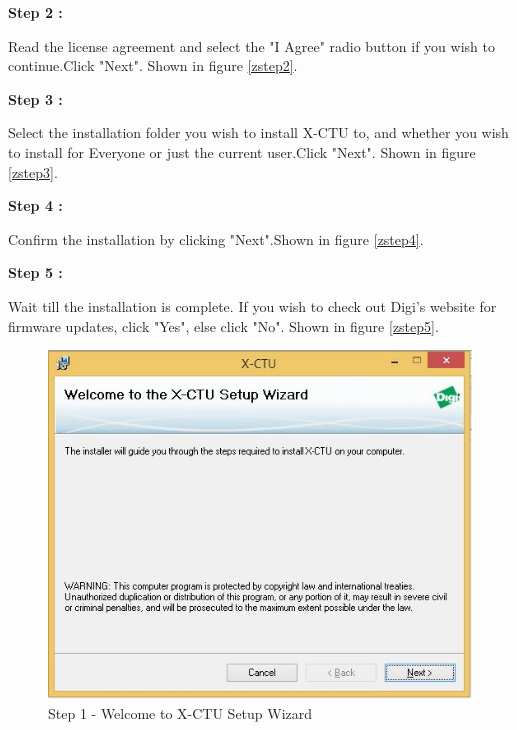 \begin{flushleft}
\medskip

\textbf{Step 2 :}

\medskip

Read the license agreement and select the "I Agree" radio button if you wish to continue.Click "Next".
Shown in figure \ref{zstep2}.

\medskip

\textbf{Step 3 :}

\medskip


Select the installation folder you wish to install X-CTU to, and whether you wish to install for Everyone or just the current user.Click "Next".
Shown in figure \ref{zstep3}.

\medskip

\textbf{Step 4 :}

\medskip

Confirm the installation by clicking "Next".Shown in figure \ref{zstep4}.

\medskip

\textbf{Step 5 :}

\medskip

Wait till the installation is complete.
If you wish to check out Digi's website for firmware updates, click "Yes", else click "No". Shown in figure \ref{zstep5}.

\begin{figure}
\begin{center}
\includegraphics[scale=0.5]{zigbee_1}
\end{center}
\caption{Step 1 - Welcome to X-CTU Setup Wizard}
\label{zstep1}
\end{figure}
\medskip


\end{flushleft}
